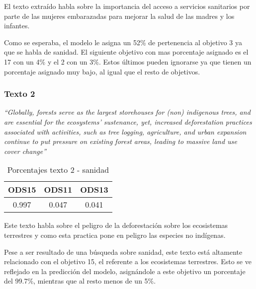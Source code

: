 El texto extraído habla sobre la importancia del acceso a servicios sanitarios
por parte de las mujeres embarazadas para mejorar la salud de las madres y los
infantes. 

Como se esperaba, el modelo le asigna un 52\% de pertenencia al objetivo 3 ya
que se habla de sanidad. El siguiente objetivo con mas porcentaje asignado es el
17 con un 4\% y el 2 con un 3\%. Estos últimos pueden ignorarse ya que tienen un
porcentaje asignado muy bajo, al igual que el resto de objetivos.

\subsubsection{Texto 2}
\begin{center}
    \textit{``Globally, forests serve as the largest storehouses for (non)
    indigenous trees, and are essential for the ecosystems' sustenance, yet,
    increased deforestation practices associated with activities, such as tree
    logging, agriculture, and urban expansion continue to put pressure on
    existing forest areas, leading to massive land use cover
    change''}\cite{validationtexts2}
    \begin{table}[H]
            \begin{tabular}{c | c | c }
                \hline
                ODS15 & ODS11 & ODS13\\ \hline
                0.997 & 0.047 & 0.041\\ \hline
            \end{tabular}%
            \caption{Porcentajes texto 2 - sanidad}
    \end{table}
\end{center}

Este texto habla sobre el peligro de la deforestación sobre los ecosistemas
terrestres y como esta practica pone en peligro las especies no indígenas.

Pese a ser resultado de una búsqueda sobre sanidad, este texto está altamente
relacionado con el objetivo 15, el referente a los ecosistemas terrestres. Esto se
ve reflejado en la predicción del modelo, asignándole a este objetivo un
porcentaje del 99.7\%, mientras que al resto menos de un 5\%.

